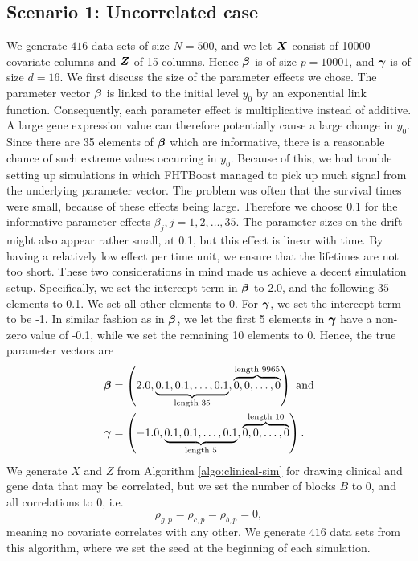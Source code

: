 \subsection{Scenario 1: Uncorrelated case}
We generate $416$ data sets of size $N=500$, and we let $\bm{X}$ consist of 10000 covariate columns and $\bm{Z}$ of 15 columns.
Hence $\boldsymbol{\beta}$ is of size $p=10001$, and $\boldsymbol{\gamma}$ is of size $d=16$.
We first discuss the size of the parameter effects we chose.
The parameter vector $\boldsymbol{\beta}$ is linked to the initial level $y_0$ by an exponential link function.
Consequently, each parameter effect is multiplicative instead of additive.
A large gene expression value can therefore potentially cause a large change in $y_0$.
Since there are 35 elements of $\boldsymbol{\beta}$ which are informative, there is a reasonable chance of such extreme values occurring in $y_0$.
Because of this, we had trouble setting up simulations in which FHTBoost managed to pick up much signal from the underlying parameter vector.
The problem was often that the survival times were small, because of these effects being large.
Therefore we choose 0.1 for the informative parameter effects $\beta_j,j=1,2,\ldots,35$.
The parameter sizes on the drift might also appear rather small, at 0.1, but this effect is linear with time.
By having a relatively low effect per time unit, we ensure that the lifetimes are not too short.
These two considerations in mind made us achieve a decent simulation setup.
Specifically, we set the intercept term in $\boldsymbol{\beta}$ to 2.0, and the following $35$ elements to 0.1.
We set all other elements to 0.
For $\boldsymbol{\gamma}$, we set the intercept term to be -1.
In similar fashion as in $\boldsymbol{\beta}$, we let the first 5 elements in $\boldsymbol{\gamma}$ have a non-zero value of -0.1, while we set the remaining 10 elements to 0.
Hence, the true parameter vectors are
\begin{align*}
    \boldsymbol{\beta}&=\left(2.0, \underbrace{0.1, 0.1, \ldots, 0.1}_{\text{length 35}}, \overbrace{0, 0, \ldots, 0}^{\text{length 9965}}\right)\text{ and}\\
    \boldsymbol{\gamma}&=\left(-1.0, \underbrace{0.1, 0.1, \ldots, 0.1}_{\text{length 5}}, \overbrace{0, 0, \ldots, 0}^{\text{length 10}}\right).
\end{align*}
We generate $X$ and $Z$ from Algorithm \ref{algo:clinical-sim} for drawing clinical and gene data that may be correlated, but we set the number of blocks $B$ to 0, and all correlations to 0, i.e.
\begin{equation*}
    \rho_{g,p}=\rho_{c,p}=\rho_{b,p}=0,
\end{equation*}
meaning no covariate correlates with any other.
We generate $416$ data sets from this algorithm, where we set the seed at the beginning of each simulation.


